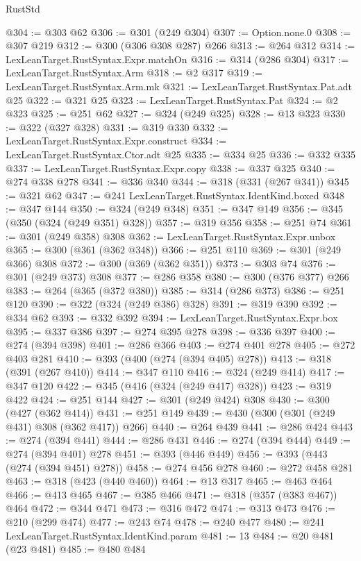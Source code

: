 \begin{lexlean}{RustStd}
\begin{coremodule}
@304 := @303 @62
@306 := @301 (@249 @304)
@307 := Option.none.{0}
@308 := @307 @219
@312 := @300 (@306 @308 @287) @266
@313 := @264 @312
@314 := LexLeanTarget.RustSyntax.Expr.matchOn
@316 := @314 (@286 @304)
@317 := LexLeanTarget.RustSyntax.Arm
@318 := @2 @317
@319 := LexLeanTarget.RustSyntax.Arm.mk
@321 := LexLeanTarget.RustSyntax.Pat.adt @25
@322 := @321 @25
@323 := LexLeanTarget.RustSyntax.Pat
@324 := @2 @323
@325 := @251 @62
@327 := @324 (@249 @325)
@328 := @13 @323
@330 := @322 (@327 @328)
@331 := @319 @330
@332 := LexLeanTarget.RustSyntax.Expr.construct
@334 := LexLeanTarget.RustSyntax.Ctor.adt @25
@335 := @334 @25
@336 := @332 @335
@337 := LexLeanTarget.RustSyntax.Expr.copy
@338 := @337 @325
@340 := @274 @338 @278
@341 := @336 @340
@344 := @318 (@331 (@267 @341))
@345 := @321 @62
@347 := @241 LexLeanTarget.RustSyntax.IdentKind.boxed
@348 := @347 @144
@350 := @324 (@249 @348)
@351 := @347 @149
@356 := @345 (@350 (@324 (@249 @351) @328))
@357 := @319 @356
@358 := @251 @74
@361 := @301 (@249 @358) @308
@362 := LexLeanTarget.RustSyntax.Expr.unbox
@365 := @300 (@361 (@362 @348))
@366 := @251 @110
@369 := @301 (@249 @366) @308
@372 := @300 (@369 (@362 @351))
@373 := @303 @74
@376 := @301 (@249 @373) @308
@377 := @286 @358
@380 := @300 (@376 @377) @266
@383 := @264 (@365 (@372 @380))
@385 := @314 (@286 @373)
@386 := @251 @120
@390 := @322 (@324 (@249 @386) @328)
@391 := @319 @390
@392 := @334 @62
@393 := @332 @392
@394 := LexLeanTarget.RustSyntax.Expr.box
@395 := @337 @386
@397 := @274 @395 @278
@398 := @336 @397
@400 := @274 (@394 @398)
@401 := @286 @366
@403 := @274 @401 @278
@405 := @272 @403 @281
@410 := @393 (@400 (@274 (@394 @405) @278))
@413 := @318 (@391 (@267 @410))
@414 := @347 @110
@416 := @324 (@249 @414)
@417 := @347 @120
@422 := @345 (@416 (@324 (@249 @417) @328))
@423 := @319 @422
@424 := @251 @144
@427 := @301 (@249 @424) @308
@430 := @300 (@427 (@362 @414))
@431 := @251 @149
@439 := @430 (@300 (@301 (@249 @431) @308 (@362 @417)) @266)
@440 := @264 @439
@441 := @286 @424
@443 := @274 (@394 @441)
@444 := @286 @431
@446 := @274 (@394 @444)
@449 := @274 (@394 @401) @278
@451 := @393 (@446 @449)
@456 := @393 (@443 (@274 (@394 @451) @278))
@458 := @274 @456 @278
@460 := @272 @458 @281
@463 := @318 (@423 (@440 @460))
@464 := @13 @317
@465 := @463 @464
@466 := @413 @465
@467 := @385 @466
@471 := @318 (@357 (@383 @467)) @464
@472 := @344 @471
@473 := @316 @472
@474 := @313 @473
@476 := @210 (@299 @474)
@477 := @243 @74
@478 := @240 @477
@480 := @241 LexLeanTarget.RustSyntax.IdentKind.param
@481 := 13
@484 := @20 @481 (@23 @481)
@485 := @480 @484

\end{coremodule}
\end{lexlean}

